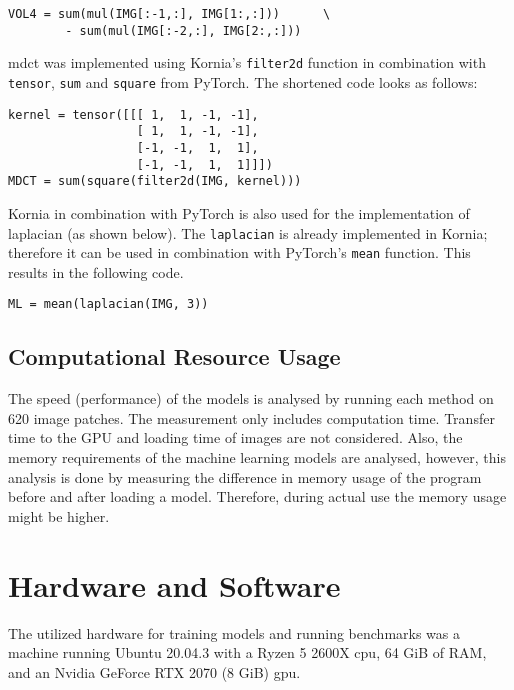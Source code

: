 \begin{lstlisting}
VOL4 = sum(mul(IMG[:-1,:], IMG[1:,:]))      \
        - sum(mul(IMG[:-2,:], IMG[2:,:]))
\end{lstlisting}


\Ac{mdct} was implemented using Kornia's \texttt{filter2d} function in combination with \texttt{tensor}, \texttt{sum} and \texttt{square} from PyTorch. The shortened code looks as follows:


\begin{lstlisting}
kernel = tensor([[[ 1,  1, -1, -1],
                  [ 1,  1, -1, -1],
                  [-1, -1,  1,  1],
                  [-1, -1,  1,  1]]])
MDCT = sum(square(filter2d(IMG, kernel)))
\end{lstlisting}

Kornia in combination with PyTorch is also used for the implementation of \ac{laplacian} (as shown below). The \texttt{laplacian} is already implemented in Kornia; therefore it can be used in combination with PyTorch's \texttt{mean} function. This results in the following code.

\begin{lstlisting}
ML = mean(laplacian(IMG, 3))
\end{lstlisting}

\subsection{Computational Resource Usage}
\label{sec:Methods:Evaluation:Computation}

The speed (performance) of the models is analysed by running each method on 620 image patches. The measurement only includes computation time. Transfer time to the GPU and loading time of images are not considered. Also, the memory requirements of the machine learning models are analysed, however, this analysis is done by measuring the difference in memory usage of the program before and after loading a model. Therefore, during actual use the memory usage might be higher.

\section{Hardware and Software}
\label{sec:Methods:Hardware}

The utilized hardware for training models and running benchmarks was a machine running Ubuntu 20.04.3 with a Ryzen 5 2600X \ac{cpu}, 64 GiB of RAM, and an Nvidia GeForce RTX 2070 (8 GiB) \ac{gpu}.
